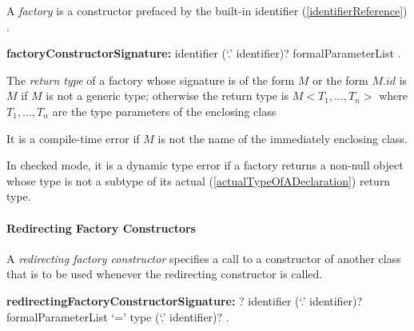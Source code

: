 \documentclass{article}
\begin{document}
\LMHash{}
A {\em factory} is a constructor prefaced by the built-in identifier  (\ref{identifierReference})   \FACTORY{}. 

\begin{grammar}
{\bf factoryConstructorSignature:}
      \FACTORY{} identifier  (`{\escapegrammar .}' identifier)?  formalParameterList
    .
\end{grammar}



\LMHash{}
The {\em return type} of a factory whose signature is of the form \FACTORY{} $M$ or the form \FACTORY{} $M.id$ is $M$ if $M$ is not a generic type; otherwise the return type is  $M <T_1, \ldots, T_n>$ where $T_1, \ldots, T_n$ are the type parameters of the enclosing class

\LMHash{}
It is a compile-time error if $M$ is not the name of the immediately enclosing class. 

\LMHash{}
In checked mode, it is a dynamic type error if a factory returns a non-null object whose type is not a subtype of its actual (\ref{actualTypeOfADeclaration}) return type.



\paragraph{Redirecting Factory Constructors}

\LMHash{}
A {\em redirecting factory constructor} specifies a call to a constructor of another class that is to be used whenever the redirecting constructor is called.

\begin{grammar}
{\bf redirectingFactoryConstructorSignature:}
      \CONST{}? \FACTORY{} identifier (`{\escapegrammar .}' identifier)? formalParameterList `=' type (`{\escapegrammar .}' identifier)?
    .
\end{grammar}
\end{document}
